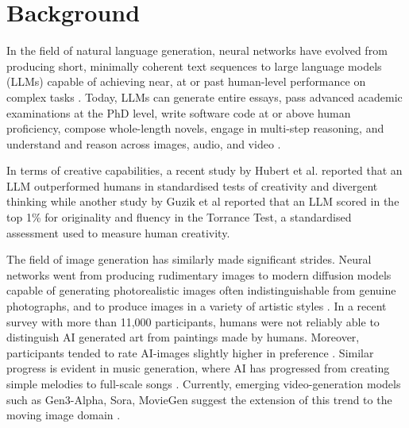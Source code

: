 \section{Background}

In the field of natural language generation, neural networks have evolved from producing short, minimally coherent text sequences \cite{Bengio2003-xn, Sutskever2011-ne, Graves2013-yv} to large language models (LLMs) capable of achieving near, at or past human-level performance on complex tasks \cite{Vaswani2017-pb, Brown2020-js, Thoppilan2022-jf, OpenAI2023-lt, Anthropic2024-tc, DeepSeek-AI2025-ai, Gemini-Team2024-wk}. Today, LLMs can generate entire essays, pass advanced academic examinations at the PhD level, write software code at or above human proficiency, compose whole-length novels, engage in multi-step reasoning, and understand and reason across images, audio, and video \cite{Gemini-Team2023-ux, OpenAI2024-em}. 

In terms of creative capabilities, a recent study by Hubert et al. reported that an LLM outperformed humans in standardised tests of creativity and divergent thinking \cite{Hubert2024-kv} while another study by Guzik et al \cite{Guzik2023-cl} reported that an LLM scored in the top 1\% for originality and fluency in the Torrance Test, a standardised assessment used to measure human creativity. 

The field of image generation has similarly made significant strides. Neural networks went from producing rudimentary images \cite{Goodfellow2014-jz, Mordvintsev2015-oz} to modern diffusion models capable of generating photorealistic images often indistinguishable from genuine photographs, and to produce images in a variety of artistic styles \cite{Ramesh2021-xb, Rombach2021-wf, Ho2020-zj, OpenAI2021-te, Nichol2021-ne, Zhang2023-by}. In a recent survey with more than 11,000 participants, humans were not reliably able to distinguish AI generated art from paintings made by humans. Moreover, participants tended to rate AI-images slightly higher in preference \cite{Alexander2024-pz}. Similar progress is evident in music generation, where AI has progressed from creating simple melodies \cite{Huang2018-pc, Dhariwal2020-au, Roberts2019-ym} to full-scale songs \cite{Copet2023-mh, Suno2024-wa, Udio2024-rc}. Currently, emerging video-generation models such as Gen3-Alpha, Sora, MovieGen suggest the extension of this trend to the moving image domain \cite{Runway2024-zs, Polyak2024-lh, OpenAI2024-ua}.

